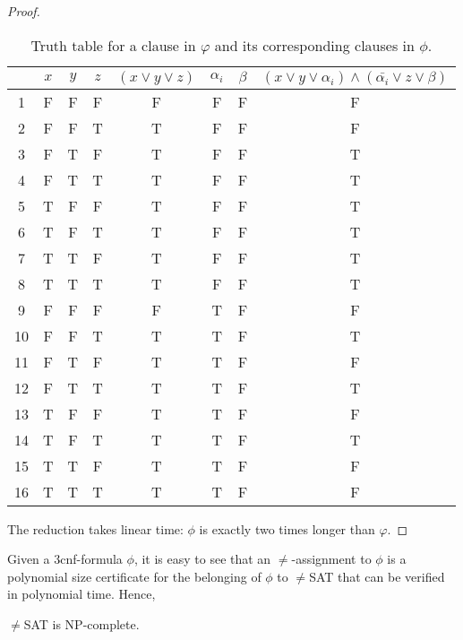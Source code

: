 \begin{proof}
\begin{table}
	\centering
	\caption{Truth table for a clause in $\varphi$ and its corresponding clauses in
	$\phi$.}\label{table}
	\begin{tabular}{|c|ccc|c|cc|c|}
	\hline
	& $x$ & $y$ & $z$ & $(x \lor y \lor z)$ & $\alpha_i$ & $\beta$ & $(x \lor
	y \lor \alpha_i) \land (\bar{\alpha_i} \lor z \lor \beta)$ \\
	\hline
	1 & F & F & F & F & F & F & F \\
	2 & F & F & T & T & F & F & F \\
	3 & F & T & F & T & F & F & T \\
	4 & F & T & T & T & F & F & T \\
	5 & T & F & F & T & F & F & T \\
	6 & T & F & T & T & F & F & T \\
	7 & T & T & F & T & F & F & T \\
	8 & T & T & T & T & F & F & T \\
	\hline
	9 & F & F & F & F & T & F & F \\
	10 & F & F & T & T & T & F & T \\
	11 & F & T & F & T & T & F & F \\
	12 & F & T & T & T & T & F & T \\
	13 & T & F & F & T & T & F & F \\
	14 & T & F & T & T & T & F & T \\
	15 & T & T & F & T & T & F & F \\
	16 & T & T & T & T & T & F & F \\
	\hline
\end{tabular}
\end{table}

The reduction takes linear time: $\phi$ is exactly two times longer than $\varphi$.
\end{proof}

Given a 3cnf-formula $\phi$, it is easy to see that an $\ne$-assignment to
$\phi$ is a polynomial size certificate for the belonging of $\phi$ to $\ne$SAT
that can be verified in polynomial time. Hence,
\begin{theorem}
  $\ne$SAT is NP-complete.
\end{theorem}
